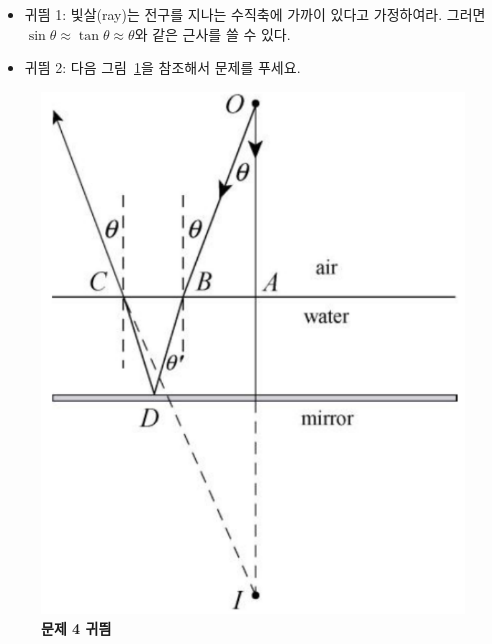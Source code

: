 \documentclass[tightenlines,floatfix,nofootinbib,superscriptaddress,fleqn]{revtex4-2}
\begin{document}
\begin{itemize}
\item \noindent 귀띔 1: 빛살(ray)는 전구를 지나는 수직축에 가까이 있다고
가정하여라. 그러면 $\sin\theta\approx \tan\theta \approx \theta$와
같은 근사를 쓸 수 있다.
\item \noindent 귀띔 2: 다음 그림~\ref{fig:3}을 참조해서 문제를 푸세요.
\end{itemize}
\begin{figure}[htp]
  \centering
  \includegraphics[scale=0.5]{qfig13-4-1-20221031.pdf} 
  \caption{\textbf{문제 4 귀띔}}
  \label{fig:3}
\end{figure}
\end{document}
